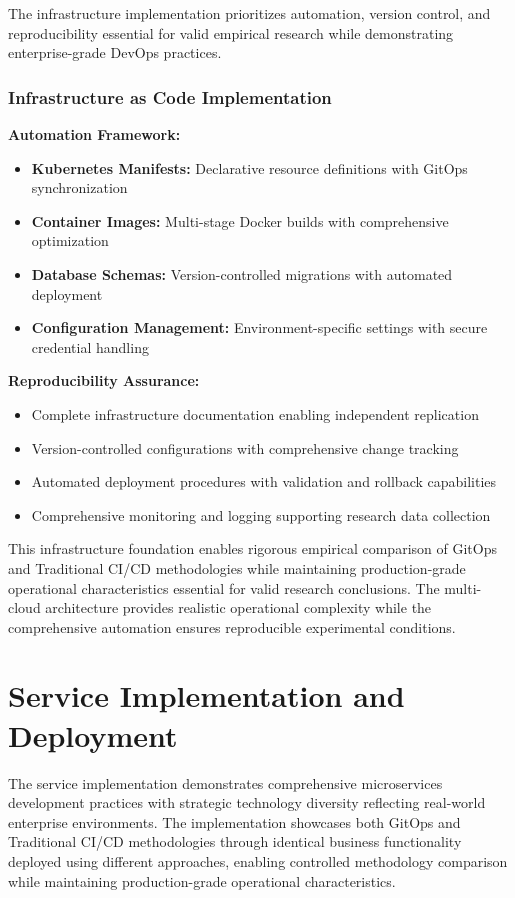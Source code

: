 The infrastructure implementation prioritizes automation, version control, and reproducibility essential for valid empirical research while demonstrating enterprise-grade DevOps practices.

\subsubsection{Infrastructure as Code Implementation}

\textbf{Automation Framework:}
\begin{itemize}
\item \textbf{Kubernetes Manifests:} Declarative resource definitions with GitOps synchronization
\item \textbf{Container Images:} Multi-stage Docker builds with comprehensive optimization
\item \textbf{Database Schemas:} Version-controlled migrations with automated deployment
\item \textbf{Configuration Management:} Environment-specific settings with secure credential handling
\end{itemize}

\textbf{Reproducibility Assurance:}
\begin{itemize}
\item Complete infrastructure documentation enabling independent replication
\item Version-controlled configurations with comprehensive change tracking
\item Automated deployment procedures with validation and rollback capabilities
\item Comprehensive monitoring and logging supporting research data collection
\end{itemize}

This infrastructure foundation enables rigorous empirical comparison of GitOps and Traditional CI/CD methodologies while maintaining production-grade operational characteristics essential for valid research conclusions. The multi-cloud architecture provides realistic operational complexity while the comprehensive automation ensures reproducible experimental conditions.

\section{Service Implementation and Deployment}

The service implementation demonstrates comprehensive microservices development practices with strategic technology diversity reflecting real-world enterprise environments. The implementation showcases both GitOps and Traditional CI/CD methodologies through identical business functionality deployed using different approaches, enabling controlled methodology comparison while maintaining production-grade operational characteristics.

